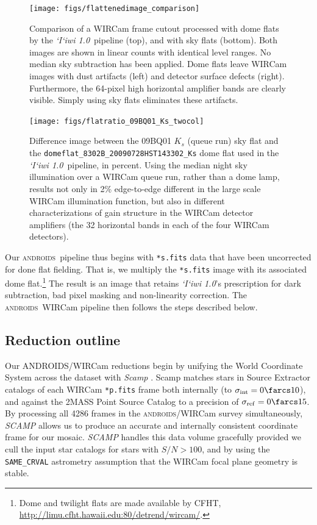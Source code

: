 \documentclass[iop]{emulateapj}
\newcommand{\sw}[1]{\textit{#1}} %
\newcommand{\iiwione}{\sw{`I`iwi 1.0}}
\newcommand{\androids}{\textsc{androids}}
\begin{document}
\begin{figure}[t]
\centering
\texttt{[image: figs/flattenedimage\_comparison]}
\caption{Comparison of a WIRCam frame cutout processed with dome flats by the \iiwione\ pipeline (top), and with sky flats (bottom).
Both images are shown in linear counts with identical level ranges.
No median sky subtraction has been applied.
Dome flats leave WIRCam images with dust artifacts (left) and detector surface defects (right). Furthermore, the 64-pixel high horizontal amplifier bands are clearly visible.
Simply using sky flats eliminates these artifacts.
}
\label{fig:flattenedimage_comparison}
\end{figure}

\begin{figure}[t]
\centering
\texttt{[image: figs/flatratio\_09BQ01\_Ks\_twocol]}
\caption{Difference image between the 09BQ01 $K_s$ (queue run) sky flat and the \texttt{domeflat\_8302B\_20090728HST143302\_Ks} dome flat used in the \iiwione\ pipeline, in percent.
Using the median night sky illumination over a WIRCam queue run, rather than a dome lamp, results not only in 2\% edge-to-edge different in the large scale WIRCam illumination function, but also in different characterizations of gain structure in the WIRCam detector amplifiers (the 32 horizontal bands in each of the four WIRCam detectors).}
\label{fig:domeflatratio}
\end{figure}

\vspace{1em}

Our \androids\ pipeline thus begins with \texttt{*s.fits} data that have been uncorrected for done flat fielding.
That is, we multiply the \texttt{*s.fits} image with its associated dome flat.\footnote{Dome and twilight flats are made available by CFHT, \url{http://limu.cfht.hawaii.edu:80/detrend/wircam/}.}
The result is an image that retains \iiwione's prescription for dark subtraction, bad pixel masking and non-linearity correction.
The \androids\ WIRCam pipeline then follows the steps described below.

\subsection{Reduction outline}
\label{sec:reduction_outline}

Our ANDROIDS/WIRCam reductions begin by unifying the World Coordinate System across the dataset with \sw{Scamp} \citep{Bertin:2006}.
Scamp matches stars in Source Extractor \citep{Bertin:1996} catalogs of each WIRCam \texttt{*p.fits} frame both internally (to $\sigma_\mathrm{int}=0\farcs 10$), and against the 2MASS Point Source Catalog \citep{Skrutskie:2006} to a precision of $\sigma_\mathrm{ref}=0 \farcs 15$.
By processing all 4286 frames in the \androids /WIRCam survey simultaneously, \sw{SCAMP} allows us to produce an accurate and internally consistent coordinate frame for our mosaic.
\sw{SCAMP} handles this data volume gracefully provided we cull the input star catalogs for stars with $S/N > 100$, and by using the \texttt{SAME\_CRVAL} astrometry assumption that the WIRCam focal plane geometry is stable.
\end{document}
